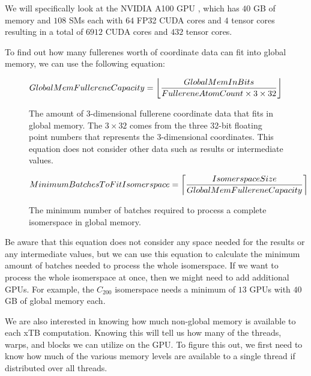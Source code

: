 

We will specifically look at the NVIDIA A100 GPU \cite{nvidia-a100-architecture}, which has $40$ GB of memory and $108$ SMs each with $64$ FP32 CUDA cores and $4$ tensor cores resulting in a total of $6912$ CUDA cores and $432$ tensor cores.

To find out how many fullerenes worth of coordinate data can fit into global memory, we can use the following equation:

\begin{figure}[H]
\begin{equation}
\begin{split}
        GlobalMemFullereneCapacity &= \floor*{\frac{GlobalMemInBits}{FullereneAtomCount \times 3 \times 32}}
\end{split}
\end{equation}
\caption{The amount of 3-dimensional fullerene coordinate data that fits in global memory. The $3 \times 32$ comes from the three $32$-bit floating point numbers that represents the 3-dimensional coordinates. This equation does not consider other data such as results or intermediate values.}
\end{figure}

\begin{figure}[H]
\begin{equation}
\begin{split}
        MinimumBatchesToFitIsomerspace &= \ceil*{\frac{IsomerspaceSize}{GlobalMemFullereneCapacity}}
\end{split}
\end{equation}
\caption{The minimum number of batches required to process a complete isomerspace in global memory.}
\end{figure}

Be aware that this equation does not consider any space needed for the results or any intermediate values, but we can use this equation to calculate the minimum amount of batches needed to process the whole isomerspace. If we want to process the whole isomerspace at once, then we might need to add additional GPUs. For example, the $C_{200}$ isomerspace needs a minimum of $13$ GPUs with $40$ GB of global memory each.

We are also interested in knowing how much non-global memory is available to each xTB computation. Knowing this will tell us how many of the threads, warps, and blocks we can utilize on the GPU. To figure this out, we first need to know how much of the various memory levels are available to a single thread if distributed over all threads.

